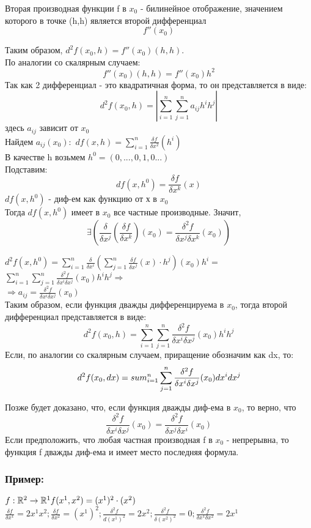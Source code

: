 \begin{opred}
Вторая производная функции f в $x_0$ - билинейное отображение, значением которого в точке (h,h) является второй дифференциал 
$$
f''(x_0)
$$
\end{opred}
Таким образом, $d^2f(x_0,h)=f''(x_0)(h,h).$
\\
По аналогии со скалярным случаем:
$$
f''(x_0)(h,h) = f''(x_0)h^2
$$
Так как 2 дифференциал - это квадратичная форма, то он представляется в виде:
$$
d^2f(x_0,h)=|\sum_{i=1}^{n}\sum_{j=1}^{n} a_{ij} h^i h^j|
$$
здесь $a_{ij}$ зависит от $x_0$
\\
Найдем $a_{ij}(x_0):$
$df(x,h)=\sum_{i=1}^{n}\frac{\delta f}{\delta x^2}(h^i)$
\\
В качестве h возьмем $h^0=(0,...,0,1,0...)$
\\
Подставим:
$$
df(x,h^0)=\frac{\delta f}{\delta x^k}(x)
$$
$df(x,h^0)$ - диф-ем как функцию от х в $x_0$
\\
Тогда $df(x,h^0)$ имеет в $x_0$ все частные производные. Значит,
$$
\exists(\frac{\delta}{\delta x^j}(\frac{\delta f}{\delta x^k})(x_0) = \frac{\delta^2 f}{\delta x^j \delta x^k}(x_0))
$$

$d^2 f(x,h^0) = \sum_{i=1}^{n}\frac{\delta}{\delta x^i}(\sum_{j=1}^{n}\frac{\delta f}{\delta x^j}(x)\cdot h^j )(x_0)h^i=$
\\
$\sum_{i=1}^{n}\sum_{j=1}^{n}\frac{\delta^2 f}{\delta x^i \delta x^j}(x_0)h^i h^j\Rightarrow$
\\
$\Rightarrow a_{ij}=\frac{\delta^2 f}{\delta x^i \delta x^j}(x_0)$
\\
Таким образом, если функция дважды дифференцируема в $x_0$, тогда второй дифференциал представляется в виде:
$$
d^2 f(x_0,h) = \sum_{i=1}^{n}\sum_{j=1}^{n}\frac{\delta^2 f}{\delta x^i \delta x^j}(x_0)h^i h^j
$$
Если, по аналогии со скалярным случаем, приращение обозначим как dx, то:
$$
d^2 f(x_0,dx) = \\sum_{i=1}^{n}\sum_{j=1}^{n}\frac{\delta^2 f}{\delta x^i \delta x^j}(x_0)dx^i dx^j
$$

Позже будет доказано, что, если функция дважды диф-ема в $x_0$, то верно, что
$$
\frac{\delta^2 f}{\delta x^i \delta x^j}(x_0)=\frac{\delta^2 f}{\delta x^j \delta x^i}(x_0)
$$
Если предположить, что любая частная производная f в $x_0$ - непрерывна, то функция f дважды диф-ема и имеет место последняя формула.
\subsubsection{Пример:}
$f:\mathbb{R}^2\to\mathbb{R}^1  f(x^1,x^2) = (x^1)^2\cdot(x^2)$
\\
$\frac{\delta f}{\delta x^1} = 2x^1 x^2; \frac{\delta f}{\delta x^2}=(x^1)^2; \frac{\delta^2 f}{d(x^1)^2} = 2x^2;\frac{\delta^2 f}{\delta (x^2)^2}=0;\frac{\delta^2 f}{\delta x^1 \delta x^2}=2x^1$

